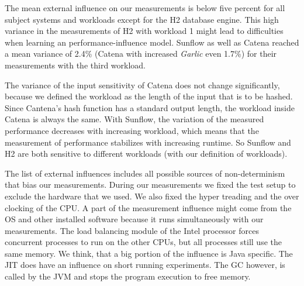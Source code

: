 


The mean external influence on our measurements is below five percent for all subject systems and workloads except for the H2 database engine. This high variance in the measurements of H2 with workload 1 might lead to difficulties when learning an performance-influence model. Sunflow as well as Catena reached a mean variance of 2.4\% (Catena with increased \textit{Garlic} even 1.7\%) for their measurements with the third workload.

The variance of the input sensitivity of Catena does not change significantly, because we defined the workload as the length of the input that is to be hashed. Since Cantena's hash function has a standard output length, the workload inside Catena is always the same. With Sunflow, the variation of the measured performance decreases with increasing workload, which means that the measurement of performance stabilizes with increasing runtime. So Sunflow and H2 are both sensitive to different workloads (with our definition of workloads).


The list of external influences includes all possible sources of non-determinism that bias our measurements. During our measurements we fixed the test setup to exclude the hardware that we used. We also fixed the hyper treading and the over clocking of the CPU. A part of the measurement influence might come from the \ac{OS} and other installed software because it runs simultaneously with our measurements. The load balancing module of the Intel processor forces concurrent processes to run on the other CPUs, but all processes still use the same memory. 
We think, that a big portion of the influence is Java specific. The \ac{JIT} does have an influence on short running experiments. The \ac{GC} however, is called by the \ac{JVM} and stops the program execution to free memory. 




